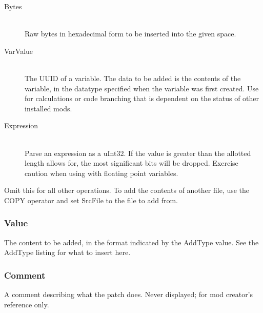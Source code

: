 \documentclass[12pt,a4paper,notitlepage]{article}
\begin{document}
\begin{description}
\item[Bytes] \hfill \\ 
    Raw bytes in hexadecimal form to be inserted into the given space.
    
    
\item[VarValue] \hfill \\
    The UUID of a variable. The data to be added is the contents of the variable, in the datatype specified when the variable was first created. Use for calculations or code branching that is dependent on the status of other installed mods.

\item[Expression] \hfill \\
    Parse an expression as a uInt32. If the value is greater than the allotted length allows for, the most significant bits will be dropped. Exercise caution when using with floating point variables.

\end{description}

Omit this for all other operations. To add the contents of another file, use the COPY operator and set SrcFile to the file to add from.

\subsubsection{Value}
The content to be added, in the format indicated by the AddType value. See the AddType listing for what to insert here.

\subsubsection{Comment}
A comment describing what the patch does. Never displayed; for mod creator's reference only.
\end{document}
